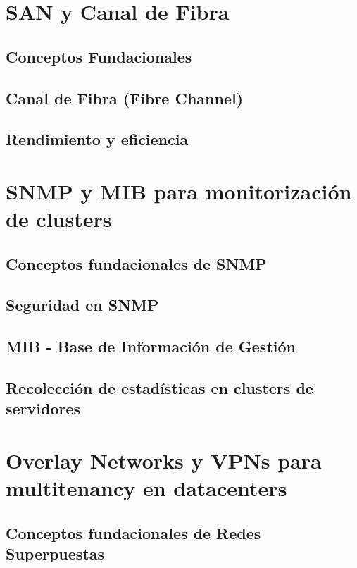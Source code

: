 \documentclass[11pt, a4paper]{book}
\begin{document}
	
	
	\tableofcontents
	\newpage
	
	\chapter{SAN y Canal de Fibra}
	\section{Conceptos Fundacionales}
	
	\section{Canal de Fibra (Fibre Channel)}
	
	\section{Rendimiento y eficiencia}
	
	
	\chapter{SNMP y MIB para monitorización de clusters}
	\section{Conceptos fundacionales de SNMP}
	
	\section{Seguridad en SNMP}
	
	\section{MIB - Base de Información de Gestión}
	
	\section{Recolección de estadísticas en clusters de servidores}
	
	
	\chapter{Overlay Networks y VPNs para multitenancy en datacenters}
	\section{Conceptos fundacionales de Redes Superpuestas}
	
\end{document}
